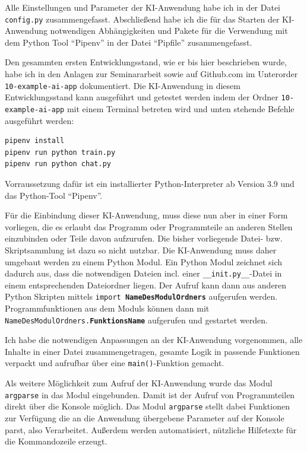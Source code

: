 \documentclass[12pt,oneside,titlepage,listof=totoc,bibliography=totoc]{scrartcl}
\newcommand{\code}[1]{\colorbox{code-gray}{\texttt{#1}}}
\begin{document}
Alle Einstellungen und Parameter der KI-Anwendung habe ich in der Datei \code{config.py} zusammengefasst. Abschließend habe ich die für das Starten der KI-Anwendung notwendigen Abhängigkeiten und Pakete für die Verwendung mit dem Python Tool \enquote{Pipenv} in der Datei \enquote{Pipfile} zusammengefasst. 

Den gesammten ersten Entwicklungsstand, wie er bis hier beschrieben wurde, habe ich in den Anlagen zur Seminararbeit sowie auf Github.com im Unterorder \code{10-example-ai-app} dokumentiert. Die KI-Anwendung in diesem Entwicklungsstand kann ausgeführt und getestet werden indem der Ordner  \code{10-example-ai-app} mit einem Terminal betreten wird und unten stehende Befehle ausgeführt werden:


\begin{lstlisting}[language=bash]
pipenv install
pipenv run python train.py
pipenv run python chat.py
\end{lstlisting}

Vorraussetzung dafür ist ein installierter Python-Interpreter ab Version 3.9 und das Python-Tool \enquote{Pipenv}.



Für die Einbindung dieser KI-Anwendung, muss diese nun aber in einer Form vorliegen, die es erlaubt das Programm oder Programmteile an anderen Stellen einzubinden oder Teile davon aufzurufen. Die bisher vorliegende Datei- bzw. Skriptsammlung ist dazu so nicht nutzbar. Die KI-Anwendung muss daher umgebaut werden zu einem Python Modul. Ein Python Modul zeichnet sich dadurch aus, dass die notwendigen Dateien incl. einer \code{__init.py__}-Datei in einem entsprechenden Dateiordner liegen. Der Aufruf kann dann aus anderen Python Skripten mittels \code{import \textbf{NameDesModulOrdners}} aufgerufen werden. Programmfunktionen aus dem Moduls können dann mit \code{NameDesModulOrdners.\textbf{FunktionsName}} aufgerufen und gestartet werden.

Ich habe die notwendigen Anpassungen an der KI-Anwendung vorgenommen, alle Inhalte in einer Datei  zusammengetragen, gesamte Logik in passende Funktionen verpackt und aufrufbar über eine \code{main()}-Funktion gemacht. 

Als weitere Möglichkeit zum Aufruf der KI-Anwendung wurde das Modul \code{argparse} in das Modul eingebunden. Damit ist der Aufruf von Programmteilen direkt über die Konsole möglich. Das Modul \code{argparse} stellt dabei Funktionen zur Verfügung die an die Anwendung übergebene Parameter auf der Konsole parst, also Verarbeitet. Außerdem werden automatisiert, nützliche Hilfetexte für die Kommandozeile erzeugt.
\end{document}
